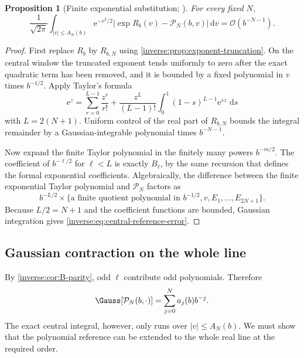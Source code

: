 \documentclass[11pt,oneside]{article}
\newtheorem{proposition}[theorem]{Proposition}
\theoremstyle{definition}
\theoremstyle{remark}
\newcommand{\e}{\mathrm e}
\newcommand{\dd}{\,\mathrm d}
\newcommand{\bigO}{\mathcal O}
\begin{document}
\begin{proposition}[Finite exponential substitution; \Formalized]
\label{inverse:prop:finite-exp-substitution}
For every fixed $N$,
\begin{equation}
 \frac1{\sqrt{2\pi}}
 \int_{|v|\leq A_N(b)}
 \e^{-v^2/2}
 \left|\exp R_b(v)-\mathcal P_N(b,v)\right|\dd v
 =\bigO(b^{-N-1}). \label{inverse:eq:central-reference-error}
\end{equation}
\end{proposition}

\begin{proof}
First replace $R_b$ by $R_{b,N}$ using
\cref{inverse:prop:exponent-truncation}.  On the central window the truncated
exponent tends uniformly to zero after the exact quadratic term has been
removed, and it is bounded by a fixed polynomial in $v$ times
$b^{-1/2}$.  Apply Taylor's formula
\[
 \e^z=\sum_{r=0}^{L-1}\frac{z^r}{r!}
      +\frac{z^L}{(L-1)!}\int_0^1(1-s)^{L-1}\e^{sz}\,\dd s
\]
with $L=2(N+1)$.  Uniform control of the real part of $R_{b,N}$ bounds the
integral remainder by a Gaussian-integrable polynomial times
$b^{-N-1}$.

Now expand the finite Taylor polynomial in the finitely many powers
$b^{-m/2}$.  The coefficient of $b^{-\ell/2}$ for
$\ell<L$ is exactly $B_\ell$, by the same recursion that defines the
formal exponential coefficients.  Algebraically, the difference between
the finite exponential Taylor polynomial and
$\mathcal P_N$ factors as
\[
 b^{-L/2}\times
 \{\text{a finite quotient polynomial in }b^{-1/2},v,
   E_1,\dots,E_{2N+1}\}.
\]
Because $L/2=N+1$ and the coefficient functions are bounded, Gaussian
integration gives \eqref{inverse:eq:central-reference-error}.
\end{proof}

\subsection{Gaussian contraction on the whole line}

By \cref{inverse:cor:B-parity}, odd $\ell$ contribute odd polynomials.  Therefore
\begin{equation}
 \Gauss[\mathcal P_N(b,\cdot)]
 =\sum_{j=0}^{N}a_j(b)b^{-j}. \label{inverse:eq:reference-contraction}
\end{equation}
The exact central integral, however, only runs over
$|v|\leq A_N(b)$.  We must show that the polynomial reference can be
extended to the whole real line at the required order.
\end{document}
